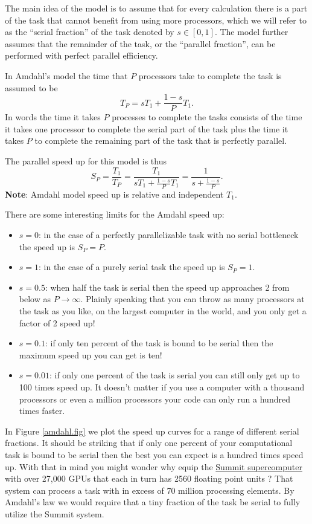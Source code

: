 The main idea of the model is to assume that for every calculation there is a part of the task that cannot benefit from using more processors, which we will refer to as the ``serial fraction'' of the task denoted by $s\in[0,1]$. The model further assumes that the remainder of the task, or the ``parallel fraction'', can be performed with perfect parallel efficiency. 

In Amdahl's model the time that $P$ processors take to complete the task is assumed to be
\[
T_P = sT_1 + \frac{1-s}{P}T_1.
\]
In words the time it takes $P$ processes to complete the tasks consists of the time it takes one processor to complete the serial part of the task plus the time it takes $P$ to complete the remaining part of the task that is perfectly parallel.

The parallel speed up for this model is thus
\[
S_P = \frac{T_1}{T_P} = \frac{T_1}{sT_1 + \frac{1-s}{P}T_1} = \frac{1}{s + \frac{1-s}{P}}.
\]
{\bf Note}: Amdahl model speed up is relative and independent $T_1$. 

There are some interesting limits for the Amdahl speed up:
\begin{itemize}
 \setlength{\itemsep}{-4pt}
    \item $s=0$: in the case of a perfectly parallelizable task with no serial bottleneck the speed up is $S_P=P$.
    \item $s=1$: in the case of a purely serial task the speed up is $S_P=1$.
    \item $s=0.5$: when half the task is serial then the speed up approaches 2 from below as $P\rightarrow\infty$. Plainly speaking that you can throw as many processors at the task as you like, on the largest computer in the world, and you only get a factor of 2 speed up!
    \item $s=0.1$: if only ten percent of the task is bound to be serial then the maximum speed up you can get is ten!
    \item $s=0.01$: if only one percent of the task is serial you can still only get up to 100 times speed up. It doesn't matter if you use a computer with a thousand processors or even a million processors your code can only run a hundred times faster.
\end{itemize}

In Figure \ref{amdahl.fig} we plot the speed up curves for a range of different serial fractions. It should be striking that if only one percent of your computational task is bound to be serial then the best you can expect is a hundred times speed up. With that in mind you might wonder why equip the \href{https://www.olcf.ornl.gov/summit/}{Summit supercomputer} with over 27,000 GPUs that each in turn has 2560 floating point units ? That system can process a task with in excess of 70 million processing elements. By Amdahl's law we would require that a tiny fraction of the task be serial to fully utilize the Summit system. 

